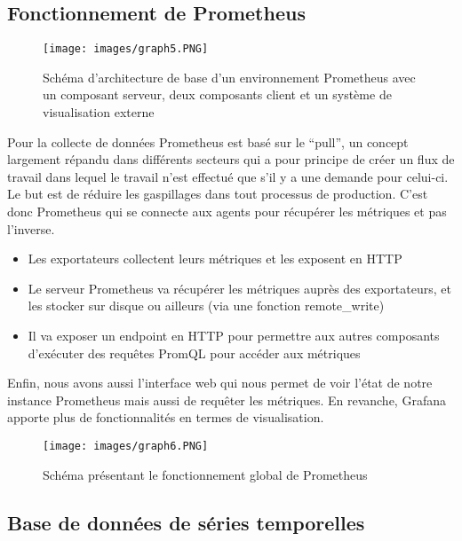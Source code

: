 \documentclass[oneside,12pt]{report}
\begin{document}
\subsection{Fonctionnement de Prometheus}

\begin{figure}[!ht]
    \centering
    \texttt{[image: images/graph5.PNG]}
    \caption{Schéma d'architecture de base d'un environnement Prometheus avec un composant serveur, deux composants client et un système de visualisation externe}
    \label{fig:mesh1}
\end{figure}

Pour la collecte de données Prometheus est basé sur le “pull”, un concept largement répandu dans différents secteurs qui a pour principe de créer un flux de travail dans lequel le travail n'est effectué que s'il y a une demande pour celui-ci. Le but est de réduire les gaspillages dans tout processus de production. C'est donc Prometheus qui se connecte aux agents pour récupérer les métriques et pas l'inverse.

\begin{itemize}

    \item Les exportateurs collectent leurs métriques et les exposent en HTTP
    
    \item Le serveur Prometheus va récupérer les métriques auprès des exportateurs, et les stocker sur disque ou ailleurs (via une fonction remote\_write) 

    \item Il va exposer un endpoint en HTTP pour permettre aux autres composants d'exécuter des requêtes PromQL pour accéder aux métriques

\end{itemize}

Enfin, nous avons aussi l'interface web qui nous permet de voir l'état de notre instance Prometheus mais aussi de requêter les métriques. En revanche, Grafana apporte plus de fonctionnalités en termes de visualisation.

\begin{figure}[H]
    \centering
    \texttt{[image: images/graph6.PNG]}
    \caption{Schéma présentant le fonctionnement global de Prometheus}
    \label{fig:mesh1}
\end{figure}

\subsection{Base de données de séries temporelles}
\end{document}
